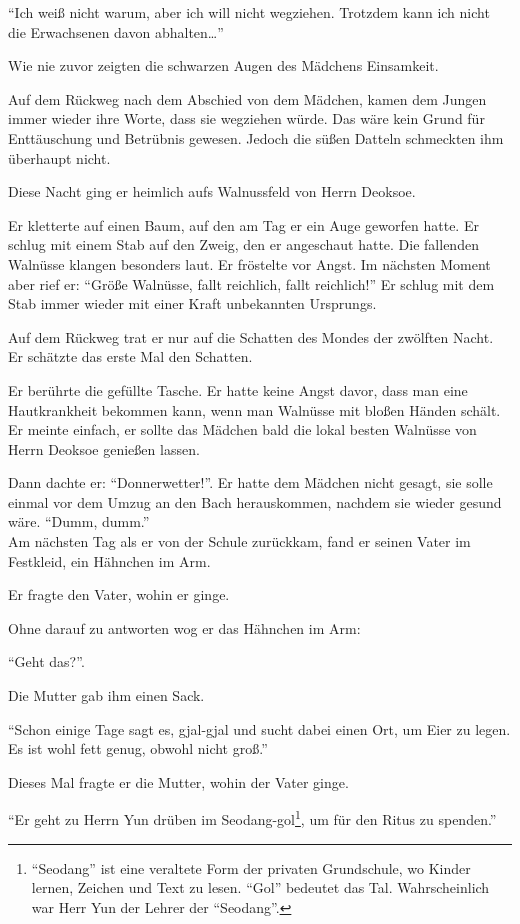 \documentclass[prd,a4paper,12pt,tightenlines,notitlepage,nofootinbib]{revtex4-1}
\begin{document}
"`Ich weiß nicht warum, aber ich will nicht wegziehen.
Trotzdem kann ich nicht die Erwachsenen davon abhalten\ldots"'

Wie nie zuvor zeigten die schwarzen Augen des Mädchens Einsamkeit.

Auf dem Rückweg nach dem Abschied von dem Mädchen,
kamen dem Jungen immer wieder ihre Worte, dass sie wegziehen würde.
Das wäre kein Grund für Enttäuschung und Betrübnis gewesen.
Jedoch die süßen Datteln schmeckten ihm überhaupt nicht.

Diese Nacht ging er heimlich aufs Walnussfeld von Herrn Deoksoe.

Er kletterte auf einen Baum, auf den am Tag er ein Auge geworfen hatte.
Er schlug mit einem Stab auf den Zweig, den er angeschaut hatte.
Die fallenden Walnüsse klangen besonders laut.
Er fröstelte vor Angst.
Im nächsten Moment aber rief er: "`Größe Walnüsse, fallt reichlich, fallt reichlich!"'
Er schlug mit dem Stab immer wieder mit einer Kraft unbekannten Ursprungs.

Auf dem Rückweg trat er nur auf die Schatten des Mondes der zwölften Nacht.
Er schätzte das erste Mal den Schatten.

Er berührte die gefüllte Tasche.
Er hatte keine Angst davor, dass
man eine Hautkrankheit bekommen kann, wenn
man Walnüsse mit bloßen Händen schält.
Er meinte einfach,
er sollte das Mädchen bald die lokal besten Walnüsse von Herrn Deoksoe
genießen lassen.

Dann dachte er: "`Donnerwetter!"'.
Er hatte dem Mädchen nicht gesagt,
sie solle einmal vor dem Umzug an den Bach herauskommen,
nachdem sie wieder gesund wäre.
"`Dumm, dumm."'
\\

Am nächsten Tag als er von der Schule zurückkam,
fand er seinen Vater im Festkleid, ein Hähnchen im Arm. %

Er fragte den Vater, wohin er ginge.

Ohne darauf zu antworten wog er das Hähnchen im Arm:

"`Geht das?"'.

Die Mutter gab ihm einen Sack.

"`Schon einige Tage sagt es, gjal-gjal
und sucht dabei einen Ort, um Eier zu legen.
Es ist wohl fett genug, obwohl nicht groß."'

Dieses Mal fragte er die Mutter, wohin der Vater ginge.

"`Er geht zu Herrn Yun drüben im Seodang-gol\footnote{
"`Seodang"' ist eine veraltete Form der privaten Grundschule,
wo Kinder lernen,
Zeichen und Text zu lesen.
"`Gol"' bedeutet das Tal.
Wahrscheinlich war Herr Yun der Lehrer der "`Seodang"'.},
um für den Ritus zu spenden."'
\end{document}
